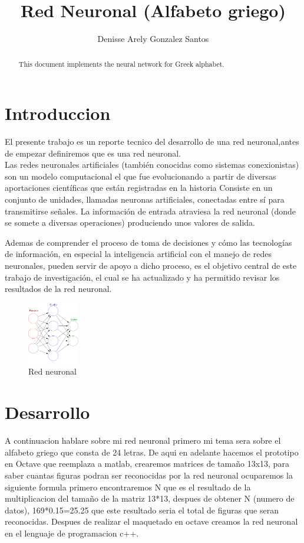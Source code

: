 \documentclass[10pt]{article}         %
\title{Red Neuronal (Alfabeto griego)}
\author{Denisse Arely Gonzalez Santos}
\begin{document}
\maketitle

\begin{abstract}
This document implements the neural network for Greek alphabet.
\end{abstract}

\section{Introduccion}

El presente trabajo es un reporte tecnico del desarrollo de una red neuronal,antes de empezar definiremos que es una red neuronal.
\\Las redes neuronales artificiales (también conocidas como sistemas conexionistas) son un modelo computacional el que fue evolucionando a partir de diversas aportaciones científicas que están registradas en la historia Consiste en un conjunto de unidades, llamadas neuronas artificiales, conectadas entre sí para transmitirse señales. La información de entrada atraviesa la red neuronal (donde se somete a diversas operaciones) produciendo unos valores de salida.

Ademas de comprender el proceso de toma de decisiones y cómo las tecnologías de información, en
especial la inteligencia artificial con el manejo de redes neuronales, pueden servir de apoyo
a dicho proceso, es el objetivo central de este trabajo de investigación, el cual se ha
actualizado y ha permitido revisar los resultados de la red neuronal.

\begin{figure}[htb]
\centering
\includegraphics[width=0.2\textwidth]{red neuronal.png}
\caption{Red neuronal}
\label{fig:tigre}
\end{figure}


\section{Desarrollo}
A continuacion hablare sobre mi red neuronal primero mi tema sera sobre el alfabeto griego que consta de 24 letras.
De aqui en adelante hacemos el prototipo en Octave que reemplaza a matlab, crearemos matrices de tamaño 13x13, para saber cuantas figuras podran ser reconocidas por la red neuronal ocuparemos la siguiente formula primero encontraremos N que es el resultado de la multiplicacion del tamaño de la matriz 13*13, despues de obtener N (numero de datos), 169*0.15=25.25 que este resultado seria el total de figuras que seran reconocidas. Despues de realizar el maquetado en octave creamos la red neuronal en el lenguaje de programacion c++.
\end{document}
